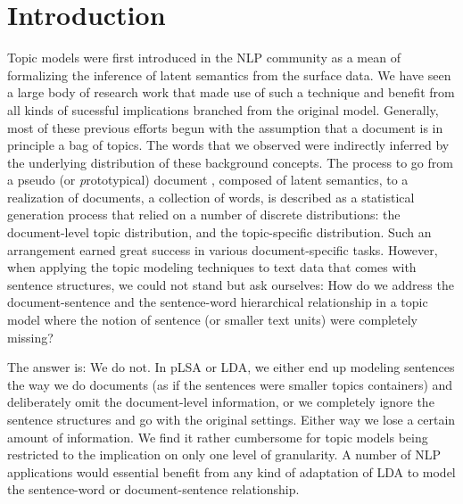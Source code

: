 \begin{abstract}
(Page 1, top) { \it Here we summarize the contribution of this work.
Supposedly, this work is regarded as an application of topic models over the
sentence level. }

\end{abstract}

\section{Introduction}

Topic models were first introduced in the NLP community as a mean of
formalizing the inference of latent semantics from the surface data.  We have
seen a large body of research work that made use of such a technique and
benefit from all kinds of sucessful implications branched from the original
model.  Generally, most of these previous efforts begun with the assumption
that a document is in principle a bag of topics.  The words that we observed
were indirectly inferred by the underlying distribution of these background
concepts.  The process to go from a pseudo (or {\emph prototypical}) document ,
composed of latent semantics, to a realization of documents, a collection of
words, is described as a statistical generation process that relied on a number
of discrete distributions: the document-level topic distribution, and the
topic-specific distribution.  Such an arrangement earned great success in
various document-specific tasks.  However, when applying the topic modeling
techniques to text data that comes with sentence structures, we could not stand
but ask ourselves: How do we address the document-sentence and the
sentence-word hierarchical relationship in a topic model where the notion of
sentence (or smaller text units) were completely missing?  

The answer is: We do not.  In pLSA or LDA, we either end up modeling sentences
the way we do documents (as if the sentences were smaller topics containers)
and deliberately omit the document-level information, or we completely ignore
the sentence structures and go with the original settings.  Either way we lose
a certain amount of information.  We find it rather cumbersome for topic models
being restricted to the implication on only one level of granularity.  A number
of NLP applications would essential benefit from any kind of adaptation of LDA
to model the sentence-word or document-sentence relationship.

